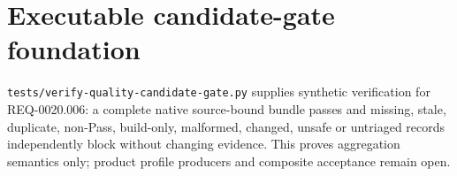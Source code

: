 \documentclass[letterpaper]{article}
\begin{document}
\section*{Executable candidate-gate foundation}
\texttt{tests/verify-quality-candidate-gate.py} supplies synthetic verification
for REQ-0020.006: a complete native source-bound bundle passes and missing,
stale, duplicate, non-Pass, build-only, malformed, changed, unsafe or untriaged
records independently block without changing evidence. This proves aggregation
semantics only; product profile producers and composite acceptance remain open.
\end{document}
